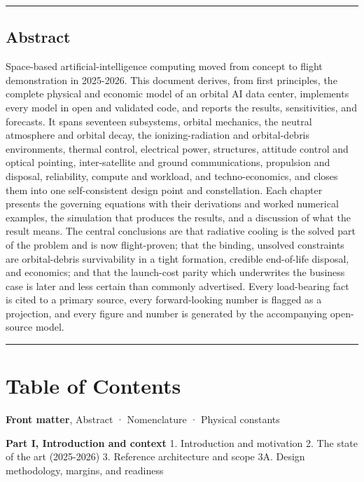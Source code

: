 \documentclass[
  11pt,
  openany,
  oneside]{book}
\begin{document}
\begin{center}\rule{0.5\linewidth}{0.5pt}\end{center}

\section{Abstract}\label{abstract}

Space-based artificial-intelligence computing moved from concept to
flight demonstration in 2025-2026. This document derives, from first
principles, the complete physical and economic model of an orbital AI
data center, implements every model in open and validated code, and
reports the results, sensitivities, and forecasts. It spans seventeen
subsystems, orbital mechanics, the neutral atmosphere and orbital decay,
the ionizing-radiation and orbital-debris environments, thermal control,
electrical power, structures, attitude control and optical pointing,
inter-satellite and ground communications, propulsion and disposal,
reliability, compute and workload, and techno-economics, and closes them
into one self-consistent design point and constellation. Each chapter
presents the governing equations with their derivations and worked
numerical examples, the simulation that produces the results, and a
discussion of what the result means. The central conclusions are that
radiative cooling is the solved part of the problem and is now
flight-proven; that the binding, unsolved constraints are orbital-debris
survivability in a tight formation, credible end-of-life disposal, and
economics; and that the launch-cost parity which underwrites the
business case is later and less certain than commonly advertised. Every
load-bearing fact is cited to a primary source, every forward-looking
number is flagged as a projection, and every figure and number is
generated by the accompanying open-source model.

\begin{center}\rule{0.5\linewidth}{0.5pt}\end{center}

\chapter{Table of Contents}\label{table-of-contents}

\textbf{Front matter}, Abstract · Nomenclature · Physical constants

\textbf{Part I, Introduction and context} 1. Introduction and motivation
2. The state of the art (2025-2026) 3. Reference architecture and scope
3A. Design methodology, margins, and readiness
\end{document}
